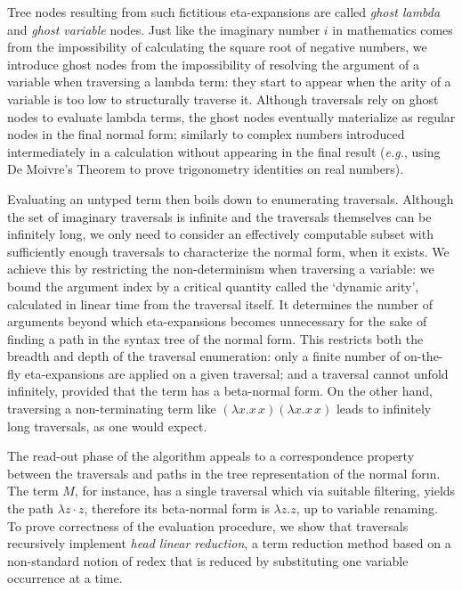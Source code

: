 \documentclass{elsarticle}
\makeatletter
\theoremstyle{plain}
\theoremstyle{definition}
\renewcommand\eg{{\it e.g.\@\xspace}}
\makeatother
\begin{document}
Tree nodes resulting from such fictitious eta-expansions
are called  \emph{ghost lambda} and \emph{ghost variable} nodes.
Just like the imaginary number $i$ in mathematics comes from the impossibility of calculating the square root of negative numbers, we introduce ghost nodes from the impossibility of resolving the argument of a variable when traversing a lambda term: they start to appear when the arity of a variable is too low to structurally traverse it.
Although traversals rely on ghost nodes to evaluate lambda terms, the ghost nodes eventually materialize as regular nodes in the final normal form;
similarly to complex numbers introduced intermediately in a calculation without appearing in the final result (\eg, using De Moivre's Theorem to prove trigonometry identities on real numbers).

Evaluating an untyped term then boils down to enumerating traversals.
 Although the set of imaginary traversals is infinite and the traversals  themselves can be infinitely long, we only need to consider an effectively computable subset with sufficiently enough traversals to characterize the normal form, when it exists.
We achieve this by restricting the non-determinism when traversing a variable: we bound the argument index by a critical quantity called the `dynamic arity', calculated in linear time from the traversal itself. It determines the number of arguments beyond which eta-expansions becomes unnecessary for the sake of finding a path in the syntax tree of the normal form. This restricts both the breadth and depth of the traversal enumeration: only a finite number of on-the-fly eta-expansions are applied on a given traversal; and a traversal cannot unfold infinitely, provided that the term has a beta-normal form.
On the other hand, traversing a non-terminating term like $(\lambda x. x\,x)(\lambda x. x\,x)$ leads to infinitely long traversals, as one would expect.

The read-out phase of the algorithm appeals to a correspondence property between the traversals and paths in the tree representation of the normal form. The term $M$, for instance, has a single traversal which via suitable filtering, yields the path $\lambda z \cdot z$, therefore its beta-normal form is $\lambda z. z$, up to variable renaming.
%
 To prove correctness of the evaluation procedure, we show that traversals recursively implement \emph{head linear reduction}, a term reduction method
 based on a non-standard notion of redex that is reduced
 by substituting one variable occurrence at a time.
\end{document}

